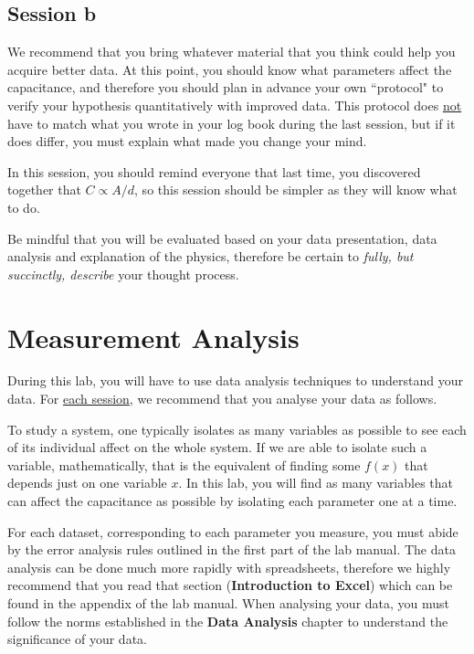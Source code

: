\documentclass[12pt]{report}
\begin{document}
\subsection{Session b}
We recommend that you bring whatever material that you think could help you acquire better data. At this point, you should know what parameters affect the capacitance, and therefore you should plan in advance your own ``protocol" to verify your hypothesis quantitatively with improved data. This protocol does \underline{not} have to match what you wrote in your log book during the last session, but if it does differ, you must explain what made you change your mind.

\begin{tcolorbox}[title=Session \#2]
In this session, you should remind everyone that last time, you discovered together that $C \propto A/d$, so this session should be simpler as they will know what to do.
\end{tcolorbox}

Be mindful that you will be evaluated based on your data presentation, data analysis and explanation of the physics, therefore be certain to \textit{fully, but succinctly, describe} your thought process. 

\section{Measurement Analysis}
During this lab, you will have to use data analysis techniques to understand your data. For \underline{each session}, we recommend that you analyse your data as follows.

To study a system, one typically isolates as many variables as possible to see each of its individual affect on the whole system. If we are able to isolate such a variable, mathematically, that is the equivalent of finding some $f(x)$ that depends just on one variable $x$. In this lab, you will find as many variables that can affect the capacitance as possible by isolating each parameter one at a time.

For each dataset, corresponding to each parameter you measure, you must abide by the error analysis rules outlined in the first part of the lab manual. The data analysis can be done much more rapidly with spreadsheets, therefore we highly recommend that you read that section (\textbf{Introduction to Excel}) which can be found in the appendix of the lab manual. When analysing your data, you must follow the norms established in the \textbf{Data Analysis} chapter to understand the significance of your data. 
\end{document}
